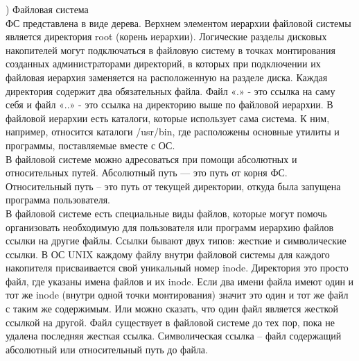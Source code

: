 ) Файловая система \\
ФС представлена в виде дерева. Верхнем элементом иерархии файловой системы является директория root (корень иерархии). Логические разделы дисковых накопителей могут подключаться в файловую систему в точках монтирования созданных администраторами директорий, в которых при подключении их файловая иерархия заменяется на расположенную на разделе диска. Каждая директория содержит два обязательных файла. Файл «.» - это ссылка на саму себя и файл «..» - это ссылка на директорию выше по файловой иерархии. В файловой иерархии есть каталоги, которые использует сама система. К ним, например, относится каталоги /usr/bin, где расположены основные утилиты и программы, поставляемые вместе с ОС. \\
В файловой системе можно адресоваться при помощи абсолютных и относительных путей. Абсолютный путь — это путь от корня ФС. Относительный путь – это путь от текущей директории, откуда была запущена программа пользователя. \\
В файловой системе есть специальные виды файлов, которые могут помочь организовать необходимую для пользователя или программ иерархию файлов ссылки на другие файлы. Ссылки бывают двух типов: жесткие и символические ссылки. В ОС UNIX каждому файлу внутри файловой системы для каждого накопителя присваивается свой уникальный номер inode. Директория это просто файл, где указаны имена файлов и их inode. Если два имени файла имеют один и тот же inode (внутри одной точки монтирования) значит это один и тот же файл с таким же содержимым. Или можно сказать, что один файл является жесткой ссылкой на другой. Файл существует в файловой системе до тех пор, пока не удалена последняя жесткая ссылка. Символическая ссылка – файл содержащий абсолютный или относительный путь до файла. \\


